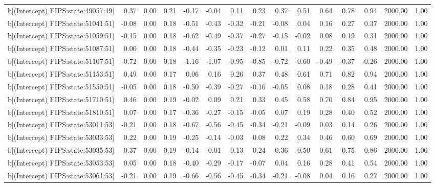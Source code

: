 \begin{table}[ht]
\begin{tabular}{rrrrrrrrrrrrrrr}
  b[(Intercept) FIPS:state:49057:49] & 0.37 & 0.00 & 0.21 & -0.17 & -0.04 & 0.11 & 0.23 & 0.37 & 0.51 & 0.64 & 0.78 & 0.94 & 2000.00 & 1.00 \\ 
  b[(Intercept) FIPS:state:51041:51] & -0.08 & 0.00 & 0.18 & -0.51 & -0.43 & -0.32 & -0.21 & -0.08 & 0.04 & 0.16 & 0.27 & 0.37 & 2000.00 & 1.00 \\ 
  b[(Intercept) FIPS:state:51059:51] & -0.15 & 0.00 & 0.18 & -0.62 & -0.49 & -0.37 & -0.27 & -0.15 & -0.02 & 0.08 & 0.19 & 0.31 & 2000.00 & 1.00 \\ 
  b[(Intercept) FIPS:state:51087:51] & 0.00 & 0.00 & 0.18 & -0.44 & -0.35 & -0.23 & -0.12 & 0.01 & 0.11 & 0.22 & 0.35 & 0.48 & 2000.00 & 1.00 \\ 
  b[(Intercept) FIPS:state:51107:51] & -0.72 & 0.00 & 0.18 & -1.16 & -1.07 & -0.95 & -0.85 & -0.72 & -0.60 & -0.49 & -0.37 & -0.26 & 2000.00 & 1.00 \\ 
  b[(Intercept) FIPS:state:51153:51] & 0.49 & 0.00 & 0.17 & 0.06 & 0.16 & 0.26 & 0.37 & 0.48 & 0.61 & 0.71 & 0.82 & 0.94 & 2000.00 & 1.00 \\ 
  b[(Intercept) FIPS:state:51550:51] & -0.05 & 0.00 & 0.18 & -0.50 & -0.39 & -0.27 & -0.16 & -0.05 & 0.08 & 0.18 & 0.28 & 0.41 & 2000.00 & 1.00 \\ 
  b[(Intercept) FIPS:state:51710:51] & 0.46 & 0.00 & 0.19 & -0.02 & 0.09 & 0.21 & 0.33 & 0.45 & 0.58 & 0.70 & 0.84 & 0.95 & 2000.00 & 1.00 \\ 
  b[(Intercept) FIPS:state:51810:51] & 0.07 & 0.00 & 0.17 & -0.36 & -0.27 & -0.15 & -0.05 & 0.07 & 0.19 & 0.28 & 0.40 & 0.52 & 2000.00 & 1.00 \\ 
  b[(Intercept) FIPS:state:53011:53] & -0.21 & 0.00 & 0.18 & -0.67 & -0.56 & -0.45 & -0.34 & -0.21 & -0.09 & 0.03 & 0.14 & 0.26 & 2000.00 & 1.00 \\ 
  b[(Intercept) FIPS:state:53033:53] & 0.22 & 0.00 & 0.19 & -0.25 & -0.14 & -0.03 & 0.08 & 0.22 & 0.34 & 0.46 & 0.60 & 0.69 & 2000.00 & 1.00 \\ 
  b[(Intercept) FIPS:state:53035:53] & 0.37 & 0.00 & 0.19 & -0.14 & -0.01 & 0.13 & 0.24 & 0.36 & 0.50 & 0.61 & 0.75 & 0.86 & 2000.00 & 1.00 \\ 
  b[(Intercept) FIPS:state:53053:53] & 0.05 & 0.00 & 0.18 & -0.40 & -0.29 & -0.17 & -0.07 & 0.04 & 0.16 & 0.28 & 0.41 & 0.54 & 2000.00 & 1.00 \\ 
  b[(Intercept) FIPS:state:53061:53] & -0.21 & 0.00 & 0.19 & -0.66 & -0.56 & -0.45 & -0.34 & -0.21 & -0.08 & 0.04 & 0.16 & 0.27 & 2000.00 & 1.00 \\ 

\end{tabular}
\end{table}
